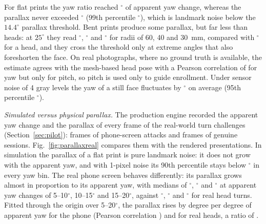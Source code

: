 \documentclass[journal]{IEEEtran}
\begin{document}
For flat prints the yaw ratio reached \parFlatRatioMax$^\circ$ of apparent yaw change, whereas the parallax never exceeded \parFlatParMax$^\circ$ (99th percentile \parFlatParQ$^\circ$), which is landmark noise below the $14.4^\circ$ parallax threshold. Bent prints produce some parallax, but far less than heads: at $25^\circ$ they read \parBentSixtyParTwentyFive$^\circ$, \parBentFortyParTwentyFive$^\circ$ and \parBentThirtyParTwentyFive$^\circ$ for radii of 60, 40 and 30~mm, compared with \parHeadParTwentyFive$^\circ$ for a head, and they cross the threshold only at extreme angles that also foreshorten the face. On real photographs, where no ground truth is available, the estimate agrees with the mesh-based head pose with a Pearson correlation of \poseR{} for yaw but only \posePitchR{} for pitch, so pitch is used only to guide enrollment. Under sensor noise of 4 gray levels the yaw of a still face fluctuates by \poseJitter$^\circ$ on average (95th percentile \poseJitterQ$^\circ$).

\emph{Simulated versus physical parallax.} The production engine recorded the apparent yaw change and the parallax of every frame of the real-world turn challenges (Section~\ref{sec:pilot}): \prPhoneFrames{} frames of \prPhoneSessions{} phone-screen attacks and \prOwnerFrames{} frames of \prOwnerSessions{} genuine sessions. Fig.~\ref{fig:parallaxreal} compares them with the rendered presentations. In simulation the parallax of a flat print is pure landmark noise: it does not grow with the apparent yaw, and with 1-pixel noise its 90th percentile stays below \prSimFlatPninety$^\circ$ in every yaw bin. The real phone screen behaves differently: its parallax grows almost in proportion to its apparent yaw, with medians of \prPhoneMedFive$^\circ$, \prPhoneMedTen$^\circ$ and \prPhoneMedFifteen$^\circ$ at apparent yaw changes of 5--10$^\circ$, 10--15$^\circ$ and 15--20$^\circ$, against \prOwnerMedFive$^\circ$, \prOwnerMedTen$^\circ$ and \prOwnerMedFifteen$^\circ$ for real head turns. Fitted through the origin over 5--20$^\circ$, the parallax rises by \prPhoneSlope{} degree per degree of apparent yaw for the phone (Pearson correlation \prPhoneR) and \prOwnerSlope{} for real heads, a ratio of \prSlopeRatio.
\end{document}
